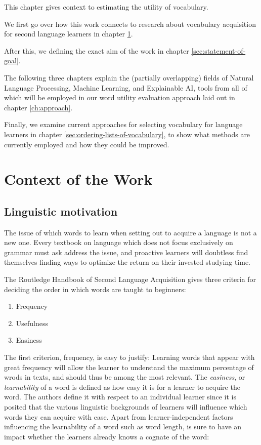 This chapter gives context to estimating the utility of vocabulary.

We first go over how this work connects to research about vocabulary acquisition for second language learners in chapter \ref{sec:context-of-work}.

After this, we defining the exact aim of the work in chapter \ref{sec:statement-of-goal}.

The following three chapters explain the (partially overlapping) fields of Natural Language Processing, Machine Learning, and Explainable AI, tools from all of which will be employed in our word utility evaluation approach laid out in chapter \ref{ch:approach}.

Finally, we examine current approaches for selecting vocabulary for language learners in chapter \ref{sec:ordering-lists-of-vocabulary}, to show what methods are currently employed and how they could be improved.


\section{Context of the Work} \label{sec:context-of-work}

\subsection{Linguistic motivation} \label{sec:linguistic-motivation}
The issue of which words to learn when setting out to acquire a language is not a new one.
Every textbook on language which does not focus exclusively on grammar must ask address the issue, and proactive learners will doubtless find themselves finding ways to optimize the return on their invested studying time.

The Routledge Handbook of Second Language Acquisition \cite{liRoutledgeHandbookSecond2022} gives three criteria for deciding the order in which words are taught to beginners:

\begin{enumerate}
	\item Frequency
	\item Usefulness
	\item Easiness
\end{enumerate}

The first criterion, frequency, is easy to justify:
Learning words that appear with great frequency will allow the learner to understand the maximum percentage of wrods in texts, and should thus be among the most relevant.
The \textit{easiness}, or \textit{learnability} of a word is defined as how easy it is for a learner to acquire the word.
The authors define it with respect to an individual learner since it is posited that the various linguistic backgrounds of learners will influence which words they can acquire with ease.
Apart from learner-independent factors influencing the learnability of a word such as word length, is sure to have an impact whether the learners already knows a cognate of the word:

